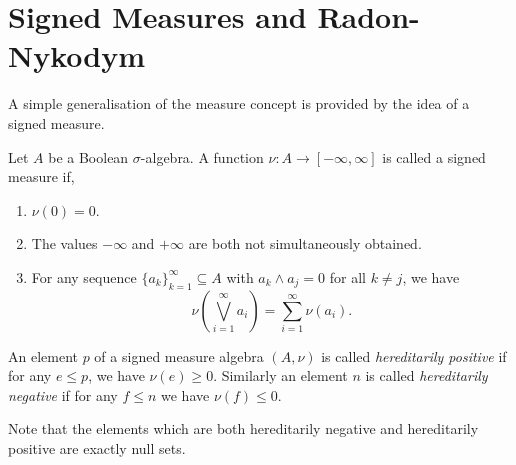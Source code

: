 \documentclass{owmaths}
\begin{document}
\section{Signed Measures and Radon-Nykodym}
A simple generalisation of the measure concept is provided
by the idea of a signed measure.
\begin{definition}
    Let $A$ be a Boolean $\sigma$-algebra. A function $\nu:A\rightarrow [-\infty,\infty]$
    is called a signed measure if,
    \begin{enumerate}
        \item{} $\nu(0) = 0$.
        \item{} The values $-\infty$ and $+\infty$ are both not simultaneously obtained.
        \item{} For any sequence $\{a_k\}_{k=1}^\infty \subseteq A$ with $a_k \wedge a_j = 0$
        for all $k\neq j$, we have
        \begin{equation*}
            \nu\left(\bigvee_{i=1}^\infty a_i\right) = \sum_{i=1}^\infty \nu(a_i).
        \end{equation*}
    \end{enumerate}
\end{definition}

\begin{definition}
    An element $p$ of a signed measure algebra $(A,\nu)$ is called \emph{hereditarily positive}
    if for any $e \leq p$, we have $\nu(e) \geq 0$. Similarly an element $n$
    is called \emph{hereditarily negative} if for any $f \leq n$ we have $\nu(f) \leq 0$.
\end{definition}
Note that the elements which are both hereditarily negative and hereditarily
positive are exactly null sets.
\end{document}
